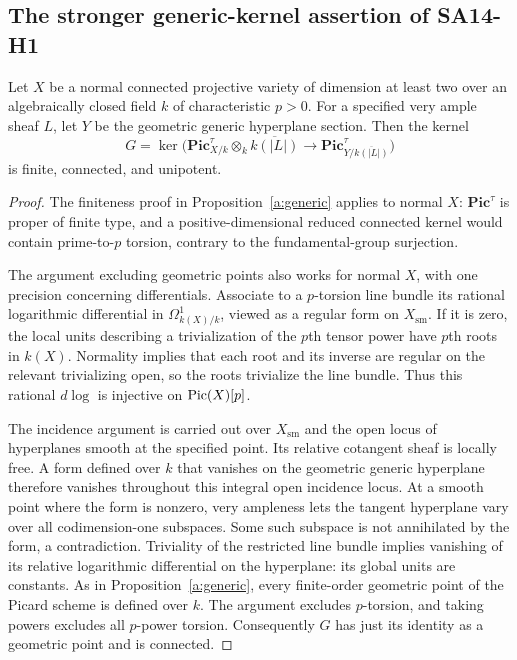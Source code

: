 \subsection{The stronger generic-kernel assertion of SA14-H1}
\begin{proposition}\label{a:generic-unipotent}
Let $X$ be a normal connected projective variety of dimension at least
two over an algebraically closed field $k$ of characteristic $p>0$.
For a specified very ample sheaf $L$, let $Y$ be the geometric generic
hyperplane section. Then the kernel
\[
 G=\ker\bigl(\mathbf{Pic}^{\tau}_{X/k}\otimes_k\overline{k(|L|)}
          \longrightarrow\mathbf{Pic}^{\tau}_{Y/\overline{k(|L|)}}\bigr)
\]
is finite, connected, and unipotent.
\end{proposition}
\begin{proof}
The finiteness proof in Proposition~\ref{a:generic} applies to normal
$X$: $\mathbf{Pic}^{\tau}$ is proper of finite type, and a
positive-dimensional reduced connected kernel would contain
prime-to-$p$ torsion, contrary to the fundamental-group surjection.

The argument excluding geometric points also works for normal $X$,
with one precision concerning differentials. Associate to a
$p$-torsion line bundle its rational logarithmic differential in
$\Omega^1_{k(X)/k}$, viewed as a regular form on $X_{\mathrm{sm}}$.
If it is zero, the local units describing a trivialization of the
$p$th tensor power have $p$th roots in $k(X)$. Normality implies that
each root and its inverse are regular on the relevant trivializing
open, so the roots trivialize the line bundle. Thus this rational
$d\log$ is injective on $\operatorname{Pic}(X)[p]$.

The incidence argument is carried out over $X_{\mathrm{sm}}$ and the
open locus of hyperplanes smooth at the specified point. Its relative
cotangent sheaf is locally free. A form defined over $k$ that vanishes
on the geometric generic hyperplane therefore vanishes throughout
this integral open incidence locus. At a smooth point where the form
is nonzero, very ampleness lets the tangent hyperplane vary over all
codimension-one subspaces. Some such subspace is not annihilated by
the form, a contradiction. Triviality of the restricted line bundle
implies vanishing of its relative logarithmic differential on the
hyperplane: its global units are constants. As in
Proposition~\ref{a:generic}, every finite-order geometric point of the
Picard scheme is defined over $k$. The argument excludes $p$-torsion,
and taking powers excludes all $p$-power torsion. Consequently $G$
has just its identity as a geometric point and is connected.


\end{proof}
